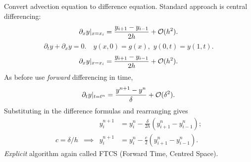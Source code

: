 \documentclass{beamer}
\begin{document}
\begin{frame}
\begin{overlayarea}{\textwidth}{0.8\textheight}
{      Convert advection equation to difference equation.
      Standard approach is central differencing:
      \begin{equation*}
        \partial_{x} y |_{x = x_i} = \frac{ y_{i+1} - y_{i-1}}{2 h} +
        {\cal O}(h^2).
      \end{equation*}
    }
    {
      \begin{equation*}
        \partial_{t} y + \partial_{x} y = 0. \quad y(x, 0) = g(x),
        \,\, y(0, t) = y(1, t).
      \end{equation*}
      \begin{equation*}
        \partial_{x} y |_{x = x_i} = \frac{ y_{i+1} - y_{i-1}}{2 h} +
        {\cal O}(h^2).
      \end{equation*}
      As before use \emph{forward} differencing in time,
      \begin{equation*}
        \partial_t y |_{t = t^n} = \frac{y^{n+1} - y^n}{\delta} + {\cal
          O}(\delta^2).
      \end{equation*}
    }
    {
      Substituting in the difference formulas and rearranging gives
      \begin{align*}
        && y_i^{n+1} & = y_i^n - \frac{\delta}{2 h} \left( y_{i+1}^n -
          y_{i-1}^n \right); \\
        c = \delta / h & \implies &
        y_i^{n+1} & = y_i^n - \frac{c}{2} \left( y_{i+1}^n -
          y_{i-1}^n \right).
      \end{align*}
    }
    {
      \emph{Explicit} algorithm again called FTCS (Forward Time,
      Centred Space).
    }
  \end{overlayarea}

\end{frame}
\end{document}
